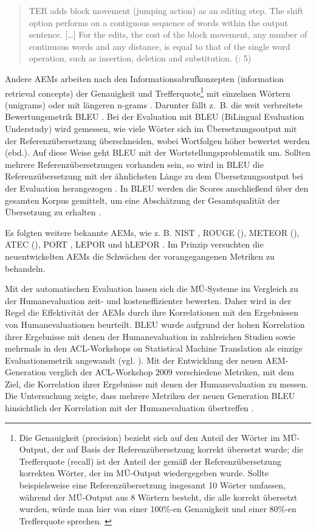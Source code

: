 \begin{quote}
TER adds block movement (jumping action) as an editing step. The shift option performs on a contiguous sequence of words within the output sentence. [\ldots] For the edits, the cost of the block movement, any number of continuous words and any distance, is equal to that of the single word operation, such as insertion, deletion and substitution. (\citealt{HanEtAl2017}: 5)
\end{quote}

Andere AEMs arbeiten nach den Informationsabrufkonzepten (information retrieval concepts) der Genauigkeit und Trefferquote\footnote{\textrm{Die Genauigkeit (precision) bezieht sich auf den Anteil der Wörter im MÜ-Output, der auf Basis der Referenzübersetzung korrekt übersetzt wurde; die Trefferquote (recall) ist der Anteil der gemäß der Referenzübersetzung korrekten Wörter, der im MÜ-Output wiedergegeben wurde. Sollte beispielsweise eine Referenzübersetzung insgesamt 10 Wörter umfassen, während der MÜ-Output aus 8 Wörtern besteht, die alle korrekt übersetzt wurden, würde man hier von einer 100\%-en Genauigkeit und einer 80\%-en Trefferquote sprechen. \citep{Doherty2017}}} mit einzelnen Wörtern (unigrams) oder mit längeren n-grams \citep{Doherty2017}. Darunter fällt z.~B. die weit verbreitete Bewertungsmetrik BLEU \citep{PapineniEtAl2002}. Bei der Evaluation mit BLEU (BiLingual Evaluation Understudy) wird gemessen, wie viele Wörter sich im Übersetzungsoutput mit der Referenzübersetzung überschneiden, wobei Wortfolgen höher bewertet werden (ebd.). Auf diese Weise geht BLEU mit der Wortstellungsproblematik um. Sollten mehrere Referenzübersetzungen vorhanden sein, so wird in BLEU die Referenzübersetzung mit der ähnlichsten Länge zu dem Übersetzungsoutput bei der Evaluation herangezogen \citep{HanEtAl2017}. In BLEU werden die Scores anschließend über den gesamten Korpus gemittelt, um eine Abschätzung der Gesamtqualität der Übersetzung zu erhalten \citep{PapineniEtAl2002}.

Es folgten weitere bekannte AEMs, wie z. B. NIST \citep{Doddington2002}, ROUGE (\citealt{LinHovy2003}), METEOR (\citealt{BanerjeeLavie2005}), ATEC (\citealt{WongKit2009}), PORT \citep{ChenEtAl2012}, LEPOR \citep{HanEtAl2012} und hLEPOR \citep{HanEtAl2013}. Im Prinzip versuchten die neuentwickelten AEMs die Schwächen der vorangegangenen Metriken zu behandeln.

Mit der automatischen Evaluation lassen sich die MÜ-Systeme im Vergleich zu der Humanevaluation zeit- und kosteneffizienter bewerten. Daher wird in der Regel die Effektivität der AEMs durch ihre Korrelationen mit den Ergebnissen von Humanevaluationen beurteilt. BLEU wurde aufgrund der hohen Korrelation ihrer Ergebnisse mit denen der Humanevaluation in zahlreichen Studien sowie mehrmals in den ACL-Workshops on Statistical Machine Translation als einzige Evaluationsmetrik angewandt (vgl. \citealt{Callison-BurchEtAl2007}). Mit der Entwicklung der neuen AEM-Generation verglich der ACL-Workshop 2009 verschiedene Metriken, mit dem Ziel, die Korrelation ihrer Ergebnisse mit denen der Humanevaluation zu messen. Die Untersuchung zeigte, dass mehrere Metriken der neuen Generation BLEU hinsichtlich der Korrelation mit der Humanevaluation übertreffen \citep{Callison-BurchEtAl2009}.


